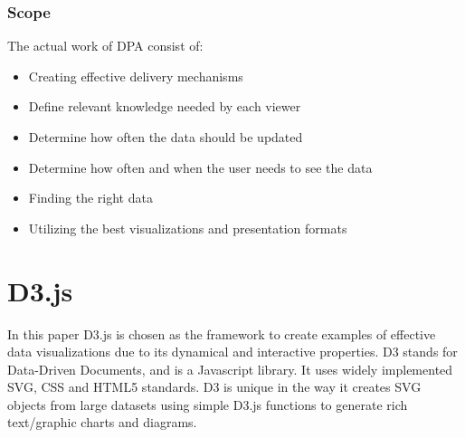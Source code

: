 \subsubsection{Scope}
The actual work of DPA consist of:
\begin{itemize}
\item Creating effective delivery mechanisms
\item Define relevant knowledge needed by each viewer
\item Determine how often the data should be updated
\item Determine how often and when the user needs to see the data
\item Finding the right data
\item Utilizing the best visualizations and presentation formats
\end{itemize}


\section{D3.js}
In this paper D3.js is chosen as the framework to create examples of effective data visualizations due to its dynamical and interactive properties. 
D3 stands for Data-Driven Documents, and is a Javascript library. It uses widely implemented SVG, CSS and HTML5 standards. D3 is unique in the way it creates SVG objects from large datasets using simple D3.js functions to generate rich text/graphic charts and diagrams. 

